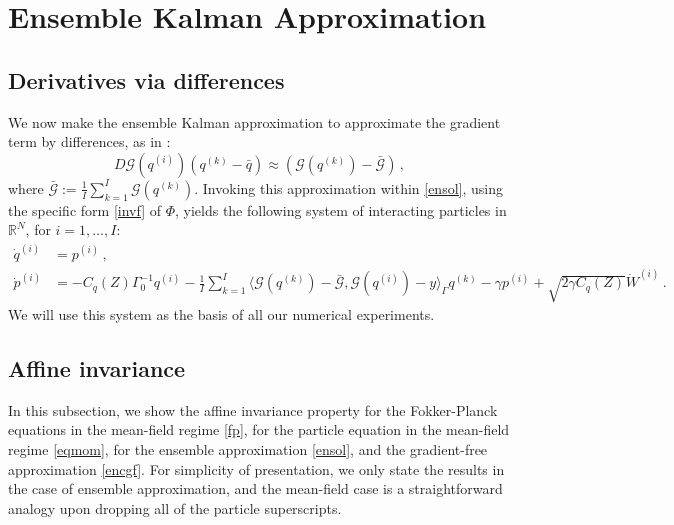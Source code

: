 \documentclass[12pt]{caltech_thesis}
\numberwithin{equation}{section}
\begin{document}
 

  
  
  
\section{Ensemble Kalman Approximation}\label{EKA}
  
\subsection{Derivatives via differences}
\label{dvd}

{We now make the ensemble Kalman approximation to approximate the gradient term by differences, as in \cite{garbuno2020interacting}:
\[D \mathcal{G}\left(q^{(i)}\right)\left(q^{(k)}-\bar{q}\right) \approx\left(\mathcal{G}\left(q^{(k)}\right)-\bar{\mathcal{G}}\right)\,,\]
where $\bar{\mathcal{G}}:=\frac{1}{I} \sum_{k=1}^{I} \mathcal{G}\left(q^{(k)}\right)$. 
Invoking this approximation within \eqref{ensol}, using the specific form
\eqref{invf} of $\Phi$,
yields the following system of interacting particles in $\mathbb{R}^N$, for $i=1, \dots, I:$}
\begin{equation}
    \label{encgf}
\begin{aligned}
\dot{q}^{(i)}&= p^{(i)}\,,  \\
\dot{p}^{(i)}&=-C_q(Z)\Gamma_0^{-1} {q}^{(i)}
-\frac{1}{I} \sum_{k=1}^{I}\langle  \mathcal{G}(q^{(k)})-\bar{\mathcal{G}}, \mathcal{G}(q^{(i)})-y\rangle_{\Gamma} q^{(k)}- {\gamma}p^{(i)}+\sqrt{2{\gamma} C_q(Z)} \dot{W}^{(i)}\,.
\end{aligned}
\end{equation}  
{We will use this system as the basis of all our numerical experiments.}




\subsection{Affine invariance}
\label{2a}



In this subsection, we show the affine invariance property \cite{goodman2010ensemble,garbuno2020affine,leimkuhler2018ensemble}  for the Fokker-Planck equations in the mean-field regime \eqref{fp}, for the particle equation in the mean-field regime \eqref{eqmom}, for the ensemble approximation \eqref{ensol}, and the gradient-free approximation  \eqref{encgf}. For simplicity of presentation, we only state the results in the case of ensemble approximation, and the mean-field case is a straightforward analogy upon dropping all of the particle superscripts.
\end{document}
